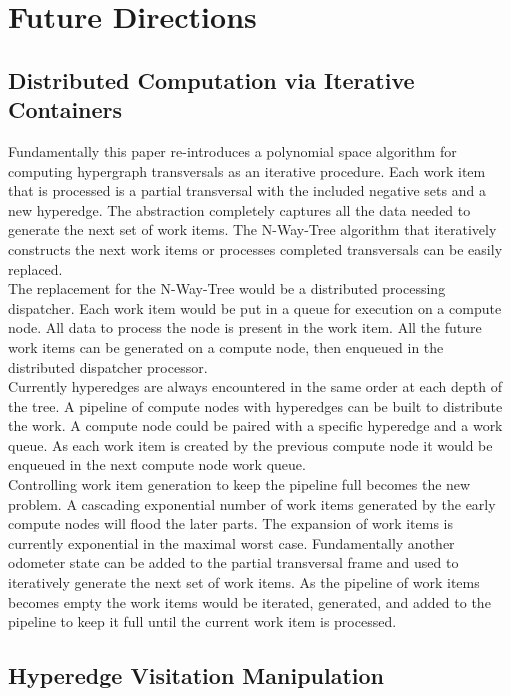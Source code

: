 \chapter{Future Directions}

\section{Distributed Computation via Iterative Containers}
Fundamentally this paper re-introduces a polynomial space algorithm for computing hypergraph transversals as an iterative procedure. Each work item that is processed is a partial transversal with the included negative sets and a new hyperedge. The abstraction completely captures all the data needed to generate the next set of work items. The N-Way-Tree algorithm that iteratively constructs the next work items or processes completed transversals can be easily replaced.\\

The replacement for the N-Way-Tree would be a distributed processing dispatcher. Each work item would be put in a queue for execution on a compute node. All data to process the node is present in the work item. All the future work items can be generated on a compute node, then enqueued in the distributed dispatcher processor. \\

Currently hyperedges are always encountered in the same order at each depth of the tree. A pipeline of compute nodes with hyperedges can be built to distribute the work. A compute node could be paired with a specific hyperedge and a work queue. As each work item is created by the previous compute node it would be enqueued in the next compute node work queue.\\

Controlling work item generation to keep the pipeline full becomes the new problem. A cascading exponential number of work items generated by the early compute nodes will flood the later parts. The expansion of work items is currently exponential in the maximal worst case. Fundamentally another odometer state can be added to the partial transversal frame and used to iteratively generate the next set of work items. As the pipeline of work items becomes empty the work items would be iterated, generated, and added to the pipeline to keep it full until the current work item is processed.\\


\section{Hyperedge Visitation Manipulation}



